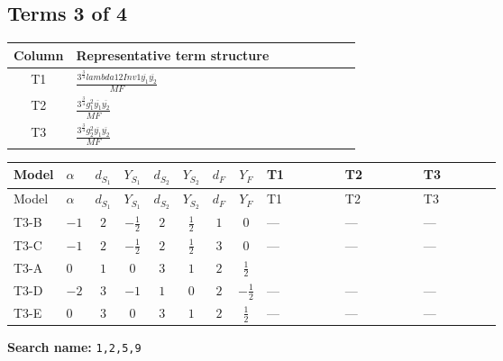 \documentclass[8pt]{article}
\begin{document}
\begin{landscape}
\subsection*{Terms 3 of 4}
\begin{center}
\begin{tabular}{@{}c >{\raggedright\arraybackslash}p{0.82\linewidth}@{}}
\toprule
Column & Representative term structure \\
\midrule
T1 & \(\displaystyle \frac{3^{\frac{3}{4}} lambda12Inv1 \overline{y_{1}} \overline{y_{2}}}{MF}\) \\
\midrule
T2 & \(\displaystyle \frac{3^{\frac{3}{4}} g_{1}^{2} \overline{y_{1}} \overline{y_{2}}}{MF}\) \\
\midrule
T3 & \(\displaystyle \frac{3^{\frac{3}{4}} g_{2}^{2} \overline{y_{1}} \overline{y_{2}}}{MF}\) \\
\midrule
\bottomrule
\end{tabular}
\end{center}
\smallskip
\tiny
\begin{longtable}{@{}llcccccc >{\raggedright\arraybackslash}p{0.21\linewidth} >{\raggedright\arraybackslash}p{0.21\linewidth} >{\raggedright\arraybackslash}p{0.21\linewidth}@{}}
\toprule
Model & $\alpha$ & $d_{S_1}$ & $Y_{S_1}$ & $d_{S_2}$ & $Y_{S_2}$ & $d_F$ & $Y_F$ & T1 & T2 & T3 \\
\midrule
\endfirsthead
\toprule
Model & $\alpha$ & $d_{S_1}$ & $Y_{S_1}$ & $d_{S_2}$ & $Y_{S_2}$ & $d_F$ & $Y_F$ & T1 & T2 & T3 \\
\midrule
\endhead
T3-B & $-1$ & $2$ & $-\frac{1}{2}$ & $2$ & $\frac{1}{2}$ & $1$ & $0$ & --- & --- & --- \\
\midrule
T3-C & $-1$ & $2$ & $-\frac{1}{2}$ & $2$ & $\frac{1}{2}$ & $3$ & $0$ & --- & --- & --- \\
\midrule
T3-A & $0$ & $1$ & $0$ & $3$ & $1$ & $2$ & $\frac{1}{2}$ & \scriptsize\adjustbox{max width=\linewidth}{$\begin{gathered} \frac{3^{\frac{3}{4}} lambda12Inv1 \overline{y_{1}} \overline{y_{2}}}{6 MF}\end{gathered}$} & \scriptsize\adjustbox{max width=\linewidth}{$\begin{gathered} \frac{3^{\frac{3}{4}} g_{1}^{2} \overline{y_{1}} \overline{y_{2}}}{8 MF}\end{gathered}$} & \scriptsize\adjustbox{max width=\linewidth}{$\begin{gathered} \frac{25 \cdot 3^{\frac{3}{4}} g_{2}^{2} \overline{y_{1}} \overline{y_{2}}}{24 MF}\end{gathered}$} \\
\midrule
T3-D & $-2$ & $3$ & $-1$ & $1$ & $0$ & $2$ & $-\frac{1}{2}$ & --- & --- & --- \\
\midrule
T3-E & $0$ & $3$ & $0$ & $3$ & $1$ & $2$ & $\frac{1}{2}$ & --- & --- & --- \\
\midrule
\bottomrule
\end{longtable}
\clearpage
\noindent\textbf{Search name: }\texttt{1,2,5,9}\par\smallskip

\end{landscape}
\end{document}
